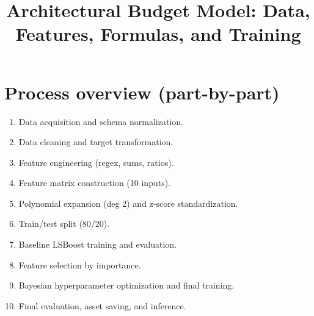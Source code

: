 \documentclass[11pt]{article}
\title{Architectural Budget Model: Data, Features, Formulas, and Training}
\date{}
\begin{document}
\maketitle

\section*{Process overview (part-by-part)}
\begin{enumerate}[label=Part~\arabic*:, leftmargin=*]
  \item Data acquisition and schema normalization.
  \item Data cleaning and target transformation.
  \item Feature engineering (regex, sums, ratios).
  \item Feature matrix construction (10 inputs).
  \item Polynomial expansion (deg 2) and z-score standardization.
  \item Train/test split (80/20).
  \item Baseline LSBoost training and evaluation.
  \item Feature selection by importance.
  \item Bayesian hyperparameter optimization and final training.
  \item Final evaluation, asset saving, and inference.
\end{enumerate}
\end{document}
